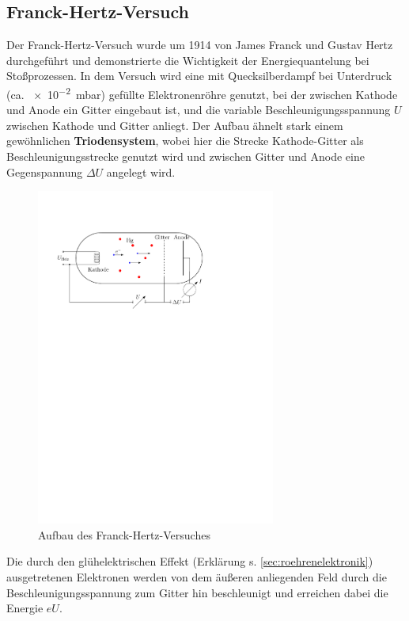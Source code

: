 \documentclass[11pt, a4paper]{article}
\begin{document}
\subsection{Franck-Hertz-Versuch}

Der Franck-Hertz-Versuch wurde um 1914 von James Franck und Gustav Hertz \cite{demtroeder3} durchgeführt und demonstrierte die Wichtigkeit der Energiequantelung bei Stoßprozessen.
In dem Versuch wird eine mit Quecksilberdampf bei Unterdruck (ca. \SI{e-2}{\milli\bar}) gefüllte Elektronenröhre genutzt, bei der zwischen Kathode und Anode ein Gitter eingebaut ist, und die variable Beschleunigungsspannung $U$ zwischen Kathode und Gitter anliegt.
Der Aufbau ähnelt stark einem gewöhnlichen \textbf{Triodensystem}, wobei hier die Strecke Kathode-Gitter als Beschleunigungsstrecke genutzt wird und zwischen Gitter und Anode eine Gegenspannung $\Delta U$ angelegt wird.
\begin{figure}[h]
\centering
\includegraphics[width=0.7\textwidth]{./figures/franck-hertz_aufbau.pdf}
\caption{Aufbau des Franck-Hertz-Versuches}
\label{fig:franck-hertz_aufbau}
\end{figure}
Die durch den glühelektrischen Effekt (Erklärung s. \ref{sec:roehrenelektronik}) ausgetretenen Elektronen werden von dem äußeren anliegenden Feld durch die Beschleunigungsspannung zum Gitter hin beschleunigt und erreichen dabei die Energie $eU$.
\end{document}
